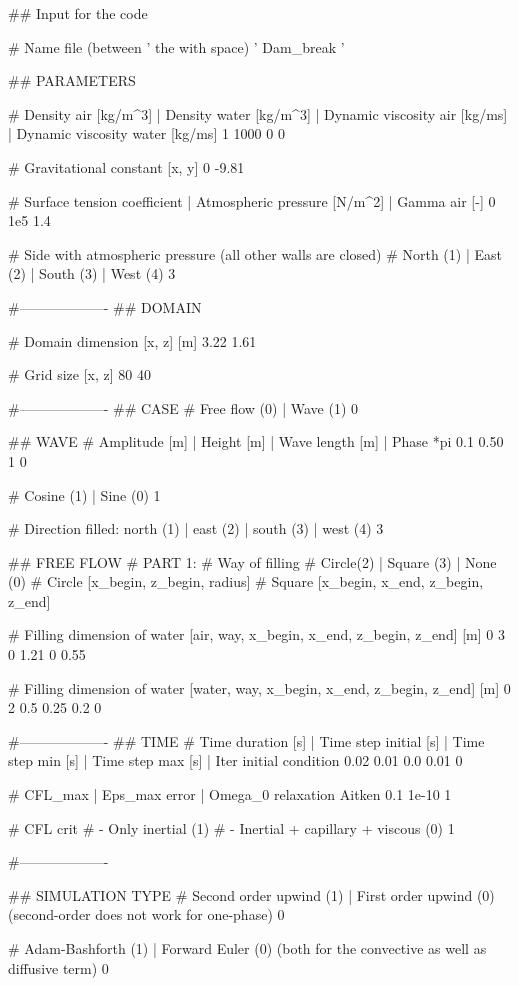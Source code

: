 ## Input for the code

# Name file (between ' the with space)
' Dam_break '

## PARAMETERS

# Density air [kg/m^3] | Density water [kg/m^3] | Dynamic viscosity air [kg/ms] | Dynamic viscosity water [kg/ms]
1	1000	0 0

# Gravitational constant [x, y]
0 -9.81

# Surface tension coefficient | Atmospheric pressure [N/m^2] | Gamma air [-]
0   	1e5 	1.4

# Side with atmospheric pressure (all other walls are closed)
# North (1) | East (2) | South (3) | West (4)
3

#-------------------
## DOMAIN

# Domain dimension [x, z] [m]
3.22 1.61

# Grid size [x, z]
80 40

#-------------------
## CASE
# Free flow (0)	| Wave (1)
0

## WAVE
# Amplitude [m] | Height [m]	| Wave length [m]	| Phase *pi
0.1 	0.50		1		0

# Cosine (1)	| Sine (0)
1

# Direction filled: north (1)	| east (2)	|	south (3)	| west (4)
3

## FREE FLOW
# PART 1:
# Way of filling
# Circle(2) |   Square (3)	|  None (0)
# Circle [x_begin, z_begin, radius]
# Square [x_begin, x_end, z_begin, z_end]

# Filling dimension of water [air, way, x_begin, x_end, z_begin, z_end] [m]
0 3 0 1.21 0 0.55

# Filling dimension of water [water, way, x_begin, x_end, z_begin, z_end] [m]
0 2 0.5 0.25 0.2 0

#-------------------
## TIME
# Time duration [s]	| Time step initial [s]		| Time step min [s]	| Time step max [s] | Iter initial condition
0.02 0.01 0.0	0.01 	0

# CFL_max | Eps_max error | Omega_0 relaxation Aitken
0.1		1e-10	1

# CFL crit
# - Only inertial (1)
# - Inertial + capillary + viscous (0)
1

#-------------------

## SIMULATION TYPE
# Second order upwind (1)	| First order upwind (0) (second-order does not work for one-phase)
0

# Adam-Bashforth (1)	| Forward Euler (0) (both for the convective as well as diffusive term)
0

